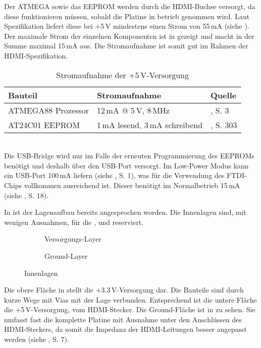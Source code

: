 Der ATMEGA sowie das EEPROM werden durch die HDMI-Buchse versorgt, da diese funktionieren müssen, sobald die Platine in betrieb genommen wird. Laut Spezifikation liefert diese bei +5\,V mindestens einen Strom von 55\,mA (siehe \cite{HDMI11}). Der maximale Strom der einzelnen Komponenten ist in  gezeigt und macht in der Summe maximal 15\,mA aus. Die Stromaufnahme ist somit gut im Rahmen der HDMI-Spezifikation.
\begin{table}[h]
\begin{tabular}{|p{4cm}|p{5cm}|p{3.5cm}|}\hline
\rowcolor{TableBackgroundColor} 
   \textbf{Bauteil} & \textbf{Stromaufnahme} & \textbf{Quelle}	\\ \hline
    ATMEGA88 Prozessor & 12\,mA @ 5\,V, 8\,MHz	& \cite{Atmel2011}, S. 3\\ \hline
	AT24C01 EEPROM & 1\,mA lesend, 3\,mA schreibend & \cite{Atmel2003}, S. 303\\ \hline
\end{tabular}
\caption{Stromaufnahme der +5\,V-Versorgung}
\label{tab:5v_strom}
\end{table} \\
Die USB-Bridge  wird nur im Falle der erneuten Programmierung des EEPROMs benötigt und deshalb über den USB-Port versorgt. Im Low-Power Modus kann ein USB-Port 100\,mA liefern (siehe \cite{USB2005}, S. 1), was für die Verwendung des FTDI-Chips vollkommen ausreichend ist. Dieser benötigt im Normalbetrieb 15\,mA (siehe \cite{FTDI2010}, S. 18).

In  ist der Lagenaufbau bereits angesprochen worden. Die Innenlagen sind, mit wenigen Ausnahmen, für die ,  und  reserviert. 
\begin{figure}[htbp]
        \centering
        \begin{subfigure}[htp]{0.48\textwidth}
                \caption{Versorgungs-Layer}
                \label{fig:teilb_vcc_layer}
        \end{subfigure}
		\quad 
        \begin{subfigure}[htp]{0.48\textwidth}
                             								\caption{Ground-Layer}
                \label{fig:teilb_gnd_layer}
        \end{subfigure}
        \caption{Innenlagen}
        \label{fig:teilb_vcc_gnd_layer}
\end{figure}
Die obere Fläche in  stellt die +3.3\,V-Versorgung dar. Die Bauteile sind durch kurze Wege mit Vias mit der Lage verbunden. Entsprechend ist die untere Fläche die +5\,V-Versorgung, vom HDMI-Stecker. Die Ground-Fläche ist in  zu sehen. Sie umfasst fast die komplette Platine mit Ausnahme unter den Anschlüssen des HDMI-Steckers, da somit die Impedanz der HDMI-Leitungen besser angepasst werden (siehe \cite{TI2007}, S. 7). 